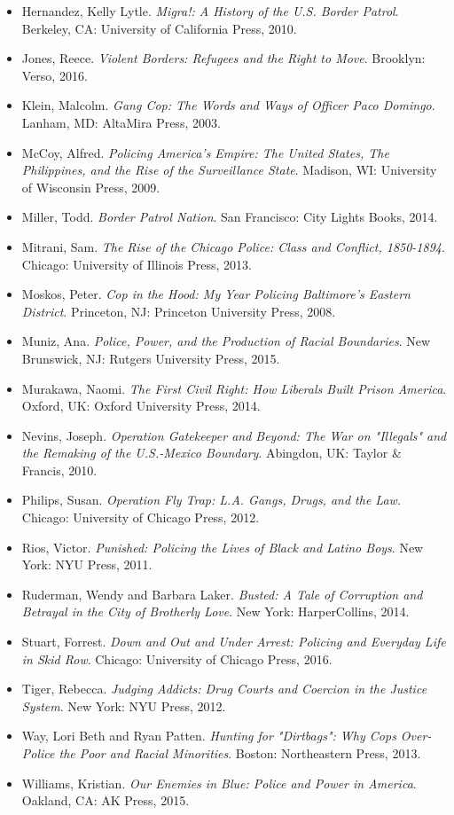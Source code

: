 \documentclass[fontset=fandol, a4paper, 12pt, openright]{ctexbook}
\begin{document}
\begin{itemize}
    \item Hernandez, Kelly Lytle. \textit{Migra!: A History of the U.S. Border Patrol}. Berkeley, CA: University of California Press, 2010.
    \item Jones, Reece. \textit{Violent Borders: Refugees and the Right to Move}. Brooklyn: Verso, 2016.
    \item Klein, Malcolm. \textit{Gang Cop: The Words and Ways of Officer Paco Domingo}. Lanham, MD: AltaMira Press, 2003.
    \item McCoy, Alfred. \textit{Policing America's Empire: The United States, The Philippines, and the Rise of the Surveillance State}. Madison, WI: University of Wisconsin Press, 2009.
    \item Miller, Todd. \textit{Border Patrol Nation}. San Francisco: City Lights Books, 2014.
    \item Mitrani, Sam. \textit{The Rise of the Chicago Police: Class and Conflict, 1850-1894}. Chicago: University of Illinois Press, 2013.
    \item Moskos, Peter. \textit{Cop in the Hood: My Year Policing Baltimore's Eastern District}. Princeton, NJ: Princeton University Press, 2008.
    \item Muniz, Ana. \textit{Police, Power, and the Production of Racial Boundaries}. New Brunswick, NJ: Rutgers University Press, 2015.
    \item Murakawa, Naomi. \textit{The First Civil Right: How Liberals Built Prison America}. Oxford, UK: Oxford University Press, 2014.
    \item Nevins, Joseph. \textit{Operation Gatekeeper and Beyond: The War on "Illegals" and the Remaking of the U.S.-Mexico Boundary}. Abingdon, UK: Taylor \& Francis, 2010.
    \item Philips, Susan. \textit{Operation Fly Trap: L.A. Gangs, Drugs, and the Law}. Chicago: University of Chicago Press, 2012.
    \item Rios, Victor. \textit{Punished: Policing the Lives of Black and Latino Boys}. New York: NYU Press, 2011.
    \item Ruderman, Wendy and Barbara Laker. \textit{Busted: A Tale of Corruption and Betrayal in the City of Brotherly Love}. New York: HarperCollins, 2014.
    \item Stuart, Forrest. \textit{Down and Out and Under Arrest: Policing and Everyday Life in Skid Row}. Chicago: University of Chicago Press, 2016.
    \item Tiger, Rebecca. \textit{Judging Addicts: Drug Courts and Coercion in the Justice System}. New York: NYU Press, 2012.
    \item Way, Lori Beth and Ryan Patten. \textit{Hunting for "Dirtbags": Why Cops Over-Police the Poor and Racial Minorities}. Boston: Northeastern Press, 2013.
    \item Williams, Kristian. \textit{Our Enemies in Blue: Police and Power in America}. Oakland, CA: AK Press, 2015.
\end{itemize}
\end{document}
